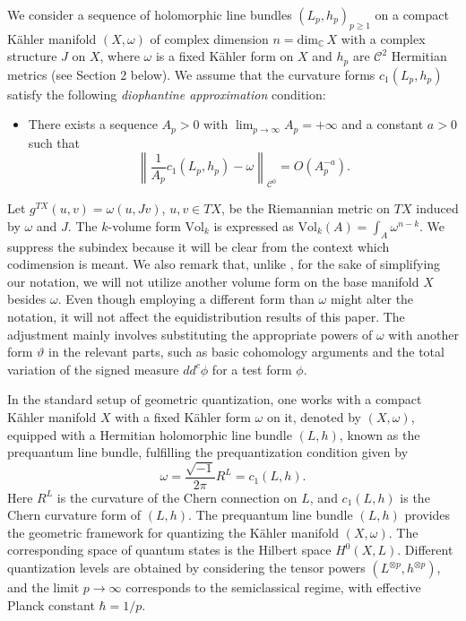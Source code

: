 \documentclass[11pt,leqno,oneside]{amsart}
\numberwithin{equation}{section}
\begin{document}
We consider a sequence of holomorphic line bundles \( (L_{p}, h_{p})_{p \geq 1} \) on a compact Kähler manifold \( (X, \omega) \) of complex dimension $n = \text{dim}_{\mathbb{C}} \, X$ with a complex structure $J$ on $X$, where $\omega$ is a fixed Kähler form on $X$ and $h_{p}$ are \( \mathscr{C}^{2} \) Hermitian metrics (see Section 2 below). We assume that the curvature forms \( c_{1}(L_{p}, h_{p}) \) satisfy the following \textit{diophantine approximation} condition:
\begin{itemize}
	\item [\textbf{(A)}] There exists a sequence \( A_{p} > 0 \) with \( \lim_{p \rightarrow \infty} A_{p} = +\infty \) and a constant \( a > 0 \) such that
	\begin{equation}\label{cur}
		\left \| \frac{1}{A_{p}} c_{1}(L_{p}, h_{p}) - \omega \right \|_{\mathscr{C}^{0}} = O(A_{p}^{-a}).
	\end{equation}
\end{itemize}
Let $g^{TX}(u, v)= \omega(u, Jv)$, $u, v \in TX$, be the Riemannian metric on $TX$ induced by $\omega$ and $J$. The $k$-volume form \( \mathrm{Vol}_k \) is expressed as \( \mathrm{Vol}_{k}(A) = \int_{A}{\omega^{n-k}} \). We suppress the subindex because it will be clear from the context which codimension is meant. We also remark that, unlike \cite{CLMM}, for the sake of simplifying our notation, we will not utilize another volume form on the base manifold $X$ besides $\omega$. Even though employing a different form than $\omega$ might alter the notation, it will not affect the equidistribution results of this paper. The adjustment mainly involves substituting the appropriate powers of $\omega$ with another form $\vartheta$ in the relevant parts, such as basic cohomology arguments and the total variation of the signed measure $dd^{c} \phi$ for a test form $\phi$.

In the standard setup of geometric quantization, one works with a compact Kähler manifold $X$ with a fixed K\"{a}hler form $\omega$ on it, denoted by $(X, \omega)$, equipped with a Hermitian holomorphic line bundle $(L, h)$, known as the prequantum line bundle, fulfilling the prequantization condition given by 
\begin{equation}\label{preq}\omega=\frac{\sqrt{-1}}{2\pi} R^{L}=c_{1}(L, h).\end{equation} 
Here $R^L$ is the curvature of the Chern connection on $L$, and $c_1(L,h)$ is the Chern curvature form of $(L,h)$. The prequantum line bundle $(L,h)$ provides the geometric framework for quantizing the Kähler manifold $(X,\omega)$. The corresponding space of quantum states is the Hilbert space $H^0(X,L)$. Different quantization levels are obtained by considering the tensor powers $(L^{\otimes p},h^{\otimes p})$, and the limit $p\to\infty$ corresponds to the semiclassical regime, with effective Planck constant $\hbar=1/p$.
\end{document}
